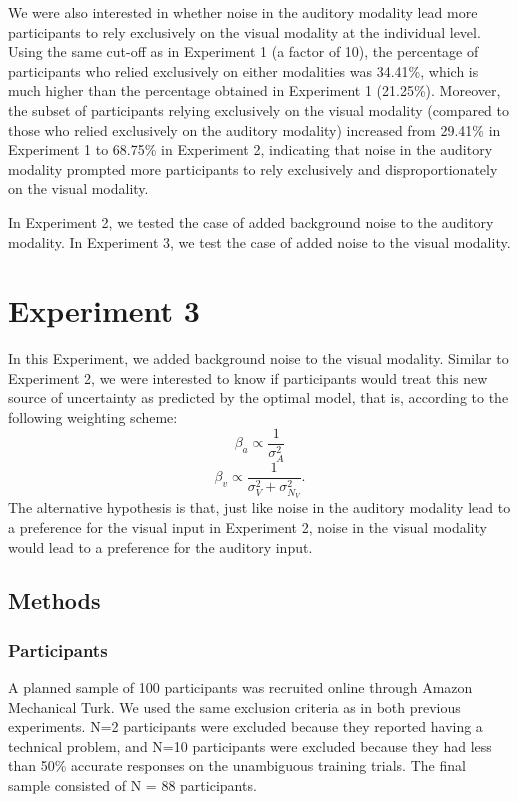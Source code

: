 \documentclass[english,floatsintext,man]{apa6}
\theoremstyle{definition}
\theoremstyle{definition}
\theoremstyle{definition}
\theoremstyle{remark}
\begin{document}
We were also interested in whether noise in the auditory modality lead
more participants to rely exclusively on the visual modality at the
individual level. Using the same cut-off as in Experiment 1 (a factor of
10), the percentage of participants who relied exclusively on either
modalities was 34.41\%, which is much higher than the percentage
obtained in Experiment 1 (21.25\%). Moreover, the subset of participants
relying exclusively on the visual modality (compared to those who relied
exclusively on the auditory modality) increased from 29.41\% in
Experiment 1 to 68.75\% in Experiment 2, indicating that noise in the
auditory modality prompted more participants to rely exclusively and
disproportionately on the visual modality.

In Experiment 2, we tested the case of added background noise to the
auditory modality. In Experiment 3, we test the case of added noise to
the visual modality.

\section{Experiment 3}\label{experiment-3}

In this Experiment, we added background noise to the visual modality.
Similar to Experiment 2, we were interested to know if participants
would treat this new source of uncertainty as predicted by the optimal
model, that is, according to the following weighting scheme:
\[\beta_a \propto \frac{1}{\sigma^2_{A}}\]
\[\beta_v \propto \frac{1}{\sigma^2_{V}+\sigma^2_{N_V}}.\] The
alternative hypothesis is that, just like noise in the auditory modality
lead to a preference for the visual input in Experiment 2, noise in the
visual modality would lead to a preference for the auditory input.

\subsection{Methods}\label{methods-2}

\subsubsection{Participants}\label{participants-2}

A planned sample of 100 participants was recruited online through Amazon
Mechanical Turk. We used the same exclusion criteria as in both previous
experiments. N=2 participants were excluded because they reported having
a technical problem, and N=10 participants were excluded because they
had less than 50\% accurate responses on the unambiguous training
trials. The final sample consisted of N = 88 participants.
\end{document}
